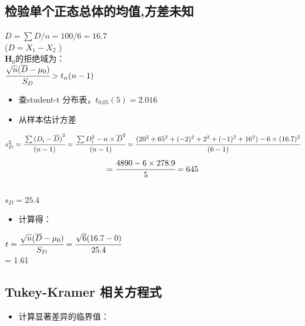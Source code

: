 \hypertarget{ux68c0ux9a8cux5355ux4e2aux6b63ux6001ux603bux4f53ux7684ux5747ux503cux65b9ux5deeux672aux77e5-1}{%
\subsection{检验单个正态总体的均值,方差未知}\label{ux68c0ux9a8cux5355ux4e2aux6b63ux6001ux603bux4f53ux7684ux5747ux503cux65b9ux5deeux672aux77e5-1}}

\(\overline{D} = \sum D / n = 100/6 = 16.7\)\\
(\(D = X_1 - X_2\) )\\
\(\mathbf{H}_0\)的拒绝域为：\\
\(\cfrac{ \sqrt{n}(\overline{D} - \mu _0) }{S_D}  > t_\alpha(n-1)\)\\

\begin{itemize}
\tightlist
\item
  查student-t 分布表，\(t_{0.05} (5) = 2.016\)
\item
  从样本估计方差\\
\end{itemize}

\(s_D^2 = \cfrac{\sum {(D_i - \overline{D})}^2  }{(n - 1)}= \cfrac{\sum D_i^2 - n \times \overline{D}^2  }{(n - 1)} = \cfrac{(20^2 + 65^2 + (-2)^2 + 2^2 + (-1)^2 + 16^2) - 6 \times (16.7)^2  }{(6 - 1)}\)\\
\[= \cfrac{4890 - 6 \times 278.9  }{5} = 645\]\\
\(s_D = 25.4\)\\

\begin{itemize}
\tightlist
\item
  计算得：
\end{itemize}

\(t = \cfrac{ \sqrt{n}(\overline{D} - \mu _0) }{S_D} = \cfrac{ \sqrt{6}(16.7 - 0) }{25.4}\)\\
 = 1.61\\

\hypertarget{tukey-kramer-ux76f8ux5173ux65b9ux7a0bux5f0f}{%
\subsection{Tukey-Kramer
相关方程式}\label{tukey-kramer-ux76f8ux5173ux65b9ux7a0bux5f0f}}

\begin{itemize}
\tightlist
\item
  计算显著差异的临界值：
\end{itemize}

